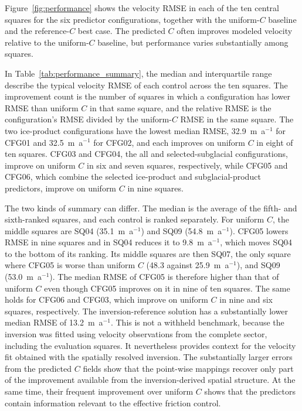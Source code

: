 \documentclass[review,jog]{igs}
\begin{document}
Figure~\ref{fig:performance} shows the velocity RMSE in each of the ten central squares for the six predictor configurations, together with the uniform-$C$ baseline and the reference-$C$ best case. The predicted $C$ often improves modeled velocity relative to the uniform-$C$ baseline, but performance varies substantially among squares.

In Table~\ref{tab:performance_summary}, the median and interquartile range describe the typical velocity RMSE of each control across the ten squares. The improvement count is the number of squares in which a configuration has lower RMSE than uniform $C$ in that same square, and the relative RMSE is the configuration's RMSE divided by the uniform-$C$ RMSE in the same square. The two ice-product configurations have the lowest median RMSE, 32.9~m~a$^{-1}$ for CFG01 and 32.5~m~a$^{-1}$ for CFG02, and each improves on uniform $C$ in eight of ten squares. CFG03 and CFG04, the all and selected-subglacial configurations, improve on uniform $C$ in six and seven squares, respectively, while CFG05 and CFG06, which combine the selected ice-product and subglacial-product predictors, improve on uniform $C$ in nine squares.

The two kinds of summary can differ. The median is the average of the fifth- and sixth-ranked squares, and each control is ranked separately. For uniform $C$, the middle squares are SQ04 (35.1~m~a$^{-1}$) and SQ09 (54.8~m~a$^{-1}$). CFG05 lowers RMSE in nine squares and in SQ04 reduces it to 9.8~m~a$^{-1}$, which moves SQ04 to the bottom of its ranking. Its middle squares are then SQ07, the only square where CFG05 is worse than uniform $C$ (48.3 against 25.9~m~a$^{-1}$), and SQ09 (53.0~m~a$^{-1}$). The median RMSE of CFG05 is therefore higher than that of uniform $C$ even though CFG05 improves on it in nine of ten squares. The same holds for CFG06 and CFG03, which improve on uniform $C$ in nine and six squares, respectively.
The inversion-reference solution has a substantially lower median RMSE of
13.2~m~a$^{-1}$. This is not a withheld benchmark, because the inversion was
fitted using velocity observations from the complete sector, including the
evaluation squares. It nevertheless provides context for the velocity fit
obtained with the spatially resolved inversion. The substantially larger errors
from the predicted $C$ fields show that the point-wise mappings recover only
part of the improvement available from the inversion-derived spatial structure.
At the same time, their frequent improvement over uniform $C$ shows that the
predictors contain information relevant to the effective friction control.
\end{document}

